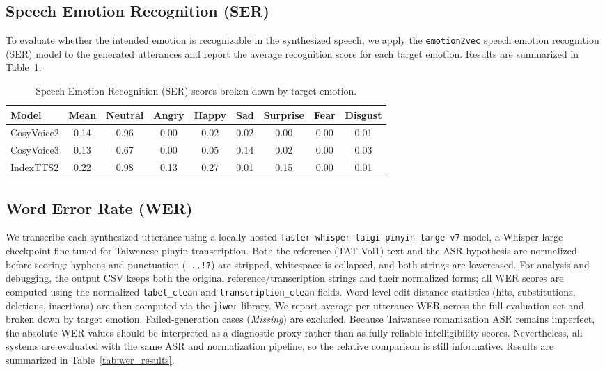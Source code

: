 \subsection{Speech Emotion Recognition (SER)}
\label{section:exp:ser}
To evaluate whether the intended emotion is recognizable in the synthesized speech, we apply the \texttt{emotion2vec} speech emotion recognition (SER) model to the generated utterances and report the average recognition score for each target emotion. Results are summarized in Table~\ref{tab:ser_by_emotion}.

\begin{table}[htbp]
\centering
\small
\caption{Speech Emotion Recognition (SER) scores broken down by target emotion.}
\label{tab:ser_by_emotion}
\setlength{\tabcolsep}{4pt}
\begin{tabular}{lcccccccc}
\toprule
\textbf{Model} & \textbf{Mean} & \textbf{Neutral} & \textbf{Angry} & \textbf{Happy} & \textbf{Sad} & \textbf{Surprise} & \textbf{Fear} & \textbf{Disgust} \\
\midrule
CosyVoice2 & 0.14 & 0.96 & 0.00 & 0.02 & 0.02 & 0.00 & 0.00 & 0.01 \\
CosyVoice3 & 0.13 & 0.67 & 0.00 & 0.05 & 0.14 & 0.02 & 0.00 & 0.03 \\
IndexTTS2 & 0.22 & 0.98 & 0.13 & 0.27 & 0.01 & 0.15 & 0.00 & 0.01 \\
\bottomrule
\end{tabular}
\end{table}

\subsection{Word Error Rate (WER)}
\label{section:exp:wer}
We transcribe each synthesized utterance using a locally hosted \texttt{faster-whisper-}\allowbreak\texttt{taigi-pinyin-}\allowbreak\texttt{large-v7} model, a Whisper-large checkpoint fine-tuned for Taiwanese pinyin transcription. Both the reference (TAT-Vol1) text and the ASR hypothesis are normalized before scoring: hyphens and punctuation (\texttt{-.,!?}) are stripped, whitespace is collapsed, and both strings are lowercased. For analysis and debugging, the output CSV keeps both the original reference/transcription strings and their normalized forms; all WER scores are computed using the normalized \texttt{label\_clean} and \texttt{transcription\_clean} fields. Word-level edit-distance statistics (hits, substitutions, deletions, insertions) are then computed via the \texttt{jiwer} library. We report average per-utterance WER across the full evaluation set and broken down by target emotion. Failed-generation cases (\textit{Missing}) are excluded. Because Taiwanese romanization ASR remains imperfect, the absolute WER values should be interpreted as a diagnostic proxy rather than as fully reliable intelligibility scores. Nevertheless, all systems are evaluated with the same ASR and normalization pipeline, so the relative comparison is still informative. Results are summarized in Table~\ref{tab:wer_results}.

